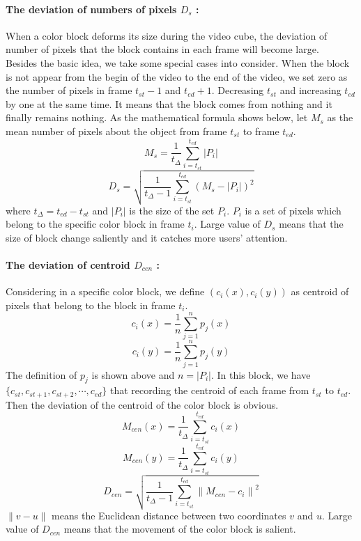 \documentclass[a4paper, twocolumn]{article}
\begin{document}
			\paragraph{The deviation of numbers of pixels $D_s$ :}
			When a color block deforms its size during the video cube, the deviation of number of pixels that the block contains in each frame will become large.\\
			\linebreak
			Besides the basic idea, we take some special cases into consider. When the block is not appear from the begin of the video to the end of the video, we set zero as the number of pixels in frame $t_{st}-1$ and $t_{ed}+1$. Decreasing $t_{st}$ and increasing $t_{ed}$ by one at the same time. It means that the block comes from nothing and it finally remains nothing. As the mathematical formula shows below, let $M_s$ as the mean number of pixels about the object from frame $t_{st}$ to frame $t_{ed}$.
			$$M_s = \frac{1}{t_{\Delta}}\sum\limits_{i=t_{st}}^{t_{ed}}\lvert P_i \lvert $$
			$$D_s = \sqrt{\frac{1}{t_{\Delta}-1}\sum\limits_{i=t_{st}}^{t_{ed}}(M_s-\lvert P_i \lvert)^2}$$
			where $t_{\Delta} = t_{ed} - t_{st}$ and $\lvert P_i \lvert$ is the size of the set $P_i$. $P_i$ is a set of pixels which belong to the specific color block in frame $t_i$. Large value of $D_s$ means that the size of block change saliently and it catches more users' attention.
			
			\paragraph{The deviation of centroid $D_{cen}$ :}
			Considering in a specific color block, we define $(c_i(x),c_i(y))$ as centroid of pixels that belong to the block in frame $t_i$.
			$$c_i(x) = \frac{1}{n}\sum\limits_{j=1}^{n}p_j(x)$$
			$$c_i(y) = \frac{1}{n}\sum\limits_{j=1}^{n}p_j(y)$$
			The definition of $p_j$ is shown above and $n=\lvert P_i \lvert$. In this block, we have $\{c_{st},c_{st+1},c_{st+2},\cdots,c_{ed}\}$ that recording the centroid of each frame from $t_{st}$ to $t_{ed}$. Then the deviation of the centroid of the color block is obvious.
			$$M_{cen}(x) = \frac{1}{t_{\Delta}}\sum\limits_{i=t_{st}}^{t_{ed}}c_i(x)$$
			$$M_{cen}(y) = \frac{1}{t_{\Delta}}\sum\limits_{i=t_{st}}^{t_{ed}}c_i(y)$$
			$$D_{cen} = \sqrt{\frac{1}{t_{\Delta}-1}\sum\limits_{i=t_{st}}^{t_{ed}}{\lVert M_{cen}-c_i \lVert}^2}$$
			$\lVert v-u \lVert$ means the Euclidean distance between two coordinates $v$ and $u$.
			Large value of $D_{cen}$ means that the movement of the color block is salient.
			
\end{document}
